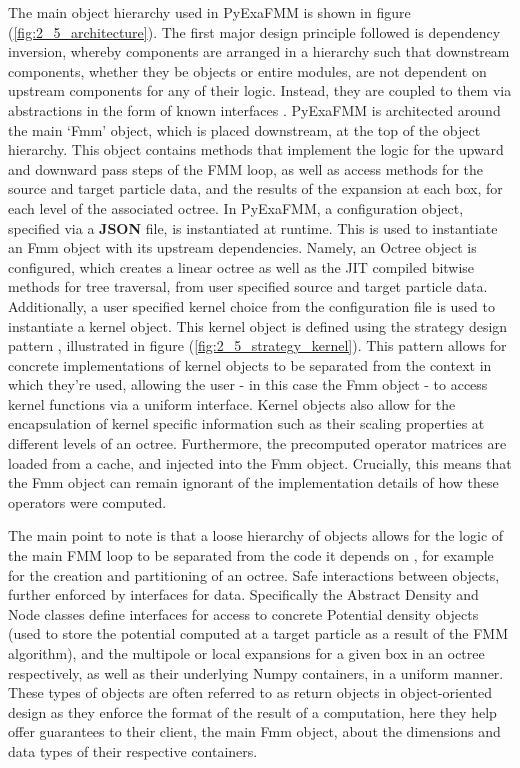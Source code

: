 The main object hierarchy used in \gls{PyExaFMM} is shown in figure
(\ref{fig:2_5_architecture}). The first major design principle followed is dependency
inversion, whereby components are arranged in a hierarchy such that downstream
components, whether they be objects or entire modules, are not dependent on
upstream components for any of their logic. Instead, they are coupled to them via
abstractions in the form of known interfaces \cite{Gamma:1994:Addison}. \gls{PyExaFMM} is architected
around the main `Fmm' object, which is placed downstream, at the top of the object hierarchy.
This object contains methods that implement the logic for the
upward and downward pass steps of the \gls{FMM} loop, as well as access methods
for the source and target particle data, and the results of the expansion at each box, for each level of the associated octree.
In \gls{PyExaFMM}, a configuration object, specified via a \textbf{\gls{JSON}} file, is instantiated
at runtime. This is used to instantiate an Fmm object with its upstream dependencies.
Namely, an Octree object is configured, which creates a linear octree as well
as the \gls{JIT} compiled bitwise methods for tree traversal, from user
specified source and target particle data. Additionally, a user specified kernel choice
from the configuration file is used to instantiate a kernel object.
This kernel object is defined using the strategy design pattern
\cite{Gamma:1994:Addison}, illustrated in figure (\ref{fig:2_5_strategy_kernel}).
This pattern allows for concrete implementations of kernel objects to be separated
from the context in which they're used, allowing the user - in this case the
Fmm object - to access kernel functions via a uniform interface. Kernel
objects also allow for the encapsulation of
kernel specific information such as their scaling properties at different levels
of an octree. Furthermore, the precomputed operator matrices are loaded from a cache,
and injected into the Fmm object. Crucially, this means that the Fmm object can
remain ignorant of the implementation details of how these operators were computed.

The main point to note is that a loose hierarchy of objects allows for
the logic of the main \gls{FMM} loop to be separated from the code it depends on
, for example for the creation and partitioning of an octree.
Safe interactions between objects, further enforced by interfaces for data.
Specifically the Abstract Density and Node classes define interfaces for access to concrete Potential density
objects (used to store the potential computed at a target particle as a result
of the FMM algorithm), and the multipole or local expansions for a given box in an octree respectively,
as well as their underlying Numpy containers, in a uniform manner.
These types of objects are often referred to as return objects in object-oriented
design as they enforce the format of the result of a computation,
here they help offer guarantees to their client, the main Fmm object,
about the dimensions and data types of their respective containers.

